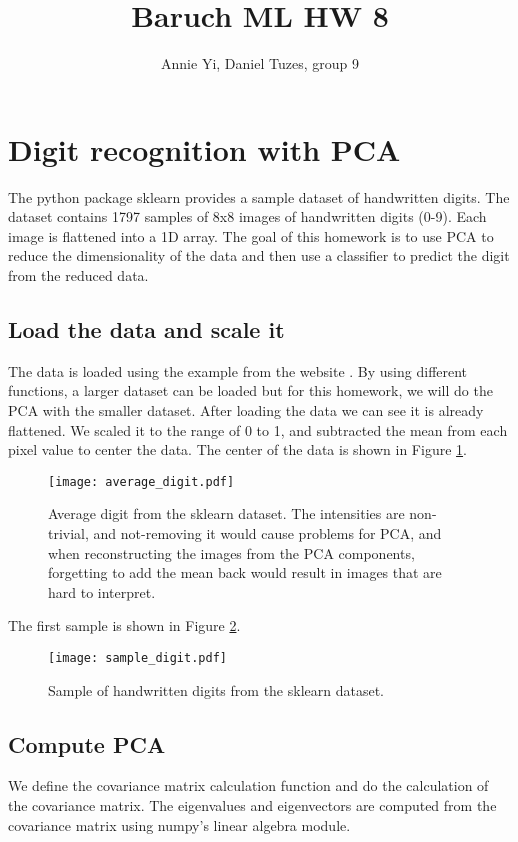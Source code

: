 \documentclass{article}
\title{Baruch ML HW 8}
\author{Annie Yi, Daniel Tuzes, group 9}
\begin{document}
\maketitle

\tableofcontents

\section{Digit recognition with PCA}
The python package sklearn provides a sample dataset of handwritten digits.
The dataset contains 1797 samples of 8x8 images of handwritten digits (0-9).
Each image is flattened into a 1D array.
The goal of this homework is to use PCA to reduce the dimensionality of the data and
then use a classifier to predict the digit from the reduced data.

\subsection{Load the data and scale it}
The data is loaded using the example from the website \cite{sklearn_digits}.
By using different functions, a larger dataset can be loaded \cite{sklearn_openml}
but for this homework, we will do the PCA with the smaller dataset.
After loading the data we can see it is already flattened.
We scaled it to the range of 0 to 1,
and subtracted the mean from each pixel value to center the data.
The center of the data is shown in Figure \ref{fig:average_digit}.

\begin{figure}

    \centering
    \texttt{[image: average\_digit.pdf]}
    \caption{Average digit from the sklearn dataset.
        The intensities are non-trivial,
        and not-removing it would cause problems for PCA,
        and when reconstructing the images from the PCA components,
        forgetting to add the mean back would result in images that are hard to interpret.}
    \label{fig:average_digit}
\end{figure}

The first sample is shown in Figure \ref{fig:digits_sample}.

\begin{figure}[ht!]
    \centering
    \texttt{[image: sample\_digit.pdf]}
    \caption{Sample of handwritten digits from the sklearn dataset.}
    \label{fig:digits_sample}
\end{figure}

\subsection{Compute PCA}
We define the covariance matrix calculation function and
do the calculation of the covariance matrix.
The eigenvalues and eigenvectors are computed from the covariance matrix
using numpy's linear algebra module.
\end{document}
